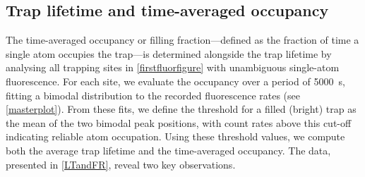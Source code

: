 \documentclass[../Thesis-IJspeert.tex]{subfiles}
\begin{document}
\subsection{Trap lifetime and time-averaged occupancy}
\label{lifetimeandfilling}
The time-averaged occupancy or filling fraction---defined as the fraction of time a single atom occupies the trap---is determined alongside the trap lifetime by analysing all trapping sites in \autoref{firstfluorfigure} with unambiguous single-atom fluorescence. For each site, we evaluate the occupancy over a period of \SI{5000}{\second}, fitting a bimodal distribution to the recorded fluorescence rates (see \autoref{masterplot}). From these fits, we define the threshold for a filled (bright) trap as the mean of the two bimodal peak positions, with count rates above this cut-off indicating reliable atom occupation. Using these threshold values, we compute both the average trap lifetime and the time-averaged occupancy. The data, presented in \autoref{LTandFR}, reveal two key observations.
\end{document}
